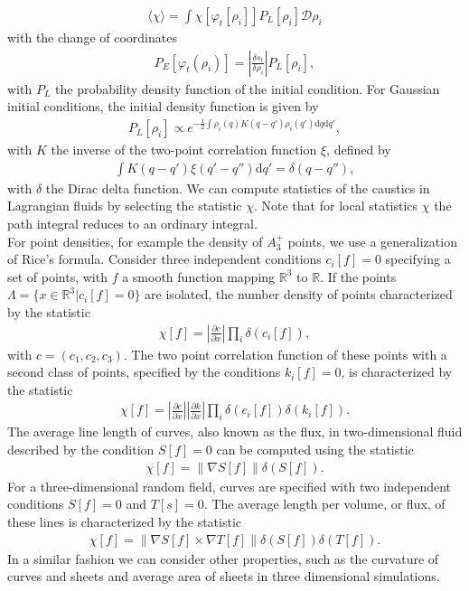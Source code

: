 \documentclass[11pt]{article}
\begin{document}
\begin{align*}
\langle \chi \rangle = \int \chi\left[\varphi_t[\rho_i]\right]  P_L[\rho_i] \mathcal{D}\rho_i
\end{align*}
with the change of coordinates
\begin{align*}
P_E[\varphi_t(\rho_i)]=\left| \frac{\delta s_t}{\delta \rho_i} \right| P_L[\rho_i],
\end{align*}
with $P_L$ the probability density function of the initial condition. For Gaussian initial conditions, the initial density function is given by
\begin{align*}
P_L[\rho_i]\propto e^{-\frac{1}{2} \int \rho_i(q) K(q-q') \rho_i(q')\mathrm{d}q \mathrm{d}q'},
\end{align*}
with $K$ the inverse of the two-point correlation function $\xi$, defined by
\begin{align*}
\int K(q-q')\xi(q'-q'')\mathrm{d}q'=\delta(q-q''),
\end{align*}
with $\delta$ the Dirac delta function. We can compute statistics of the caustics in Lagrangian fluids by selecting the statistic $\chi$. Note that for local statistics $\chi$ the path integral reduces to an ordinary integral.\\
\indent For point densities, for example the density of $A_3^+$ points, we use a generalization of Rice's formula. Consider three independent conditions $c_i[f]=0$ specifying a set of points, with $f$ a smooth function mapping $\mathbb{R}^3$ to $\mathbb{R}$. If the points $\Lambda=\{x \in \mathbb{R}^3|c_i[f]=0\}$ are isolated, the number density of points characterized by the statistic
\begin{align}
\chi[f]=\left|\frac{\partial c}{\partial x} \right|\prod_i\delta(c_i[f]),
\end{align}
with $c=(c_1,c_2,c_3)$. The two point correlation function of these points with a second class of points, specified by the conditions $k_i[f] = 0 $, is characterized by the statistic 
\begin{align}
\chi[f]= \left|\frac{\partial c}{\partial x} \right|\left|\frac{\partial k}{\partial x} \right|\prod_i\delta(c_i[f])\delta(k_i[f]).
\end{align}
\indent The average line length of curves, also known as the flux, in two-dimensional fluid described by the condition $S[f]=0$ can be computed using the statistic
\begin{align}
\chi[f] = \|\nabla S[f]\| \delta (S[f]).
\end{align}
For a three-dimensional random field, curves are specified with two independent conditions $S[f]=0$ and $T[s]=0$. The average length per volume, or flux, of these lines is characterized by the statistic
\begin{align}
\chi[f] = \|\nabla S[f] \times \nabla T[f] \| \delta(S[f]) \delta(T[f]).
\end{align}
 \indent In a similar fashion we can consider other properties, such as the curvature of curves and sheets and average area of sheets in three dimensional simulations.
 
\end{document}
